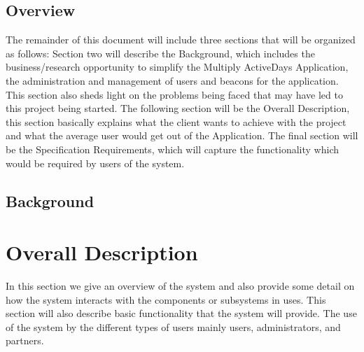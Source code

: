 \documentclass[11pt]{article}
\begin{document}
\subsection{Overview}
The remainder of this document will include three sections that will be organized as follows:
Section two will describe the Background, which includes the business/research opportunity to
simplify the Multiply ActiveDays Application, the administration and management of users and beacons for the application. This section also sheds light on the problems being faced that may have led
to this project being started. The following section will be the Overall Description, this section basically explains what the client wants to achieve with the project and what the average user would get out of the Application. The final section will be the Specification Requirements, which will capture the functionality which would be required by users of the system.
\subsection{Background}

\section{Overall Description}
In this section we give an overview of the system and also provide some detail on how the system interacts with the components or subsystems in uses. This section will also describe basic functionality that the system will provide. The use of the system by the different types of users mainly users, administrators, and partners.     
\end{document}
